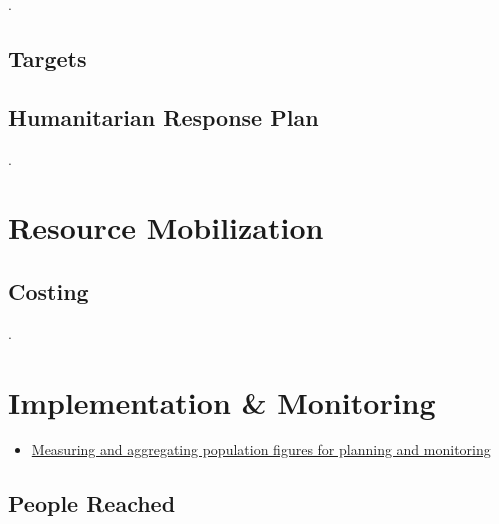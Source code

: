 \documentclass[
  a4paper,
  onecolumn,
  oneside]{book}
\providecommand{\tightlist}{%
  \setlength{\itemsep}{0pt}\setlength{\parskip}{0pt}}\usepackage{longtable,booktabs,array}
\begin{document}
.

\hypertarget{targets}{%
\section{Targets}\label{targets}}

\hypertarget{humanitarian-response-plan}{%
\section{Humanitarian Response Plan}\label{humanitarian-response-plan}}

.

\hypertarget{resource-mobilization}{%
\chapter{Resource Mobilization}\label{resource-mobilization}}

\hypertarget{costing}{%
\section{Costing}\label{costing}}

.

\hypertarget{implementation-monitoring}{%
\chapter{Implementation \& Monitoring}\label{implementation-monitoring}}

\begin{tcolorbox}[enhanced jigsaw, left=2mm, rightrule=.15mm, arc=.35mm, coltitle=black, opacityback=0, colframe=quarto-callout-tip-color-frame, breakable, toprule=.15mm, titlerule=0mm, leftrule=.75mm, opacitybacktitle=0.6, title=\textcolor{quarto-callout-tip-color}{\faLightbulb}\hspace{0.5em}{Recommended reading}, bottomtitle=1mm, toptitle=1mm, bottomrule=.15mm, colbacktitle=quarto-callout-tip-color!10!white, colback=white]

\begin{itemize}
\tightlist
\item
  \href{files/OCHA\%20Approaches\%20to\%20determining\%20people\%20reached\%202022.pdf}{Measuring
  and aggregating population figures for planning and monitoring}
\end{itemize}

\end{tcolorbox}

\hypertarget{people-reached}{%
\section{People Reached}\label{people-reached}}
\end{document}
